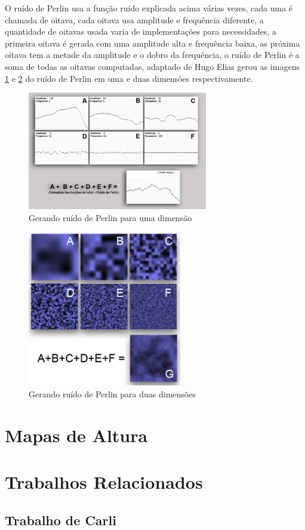 O ruído de Perlin usa a função ruído explicada acima várias vezes, cada uma é chamada
de oitava, cada oitava usa amplitude e frequência diferente, a quantidade de oitavas
usada varia de implementações para necessidades, a primeira oitava é gerada com uma
amplitude alta e frequência baixa, as próxima oitava tem a metade da amplitude e 
o dobro da frequência, o ruído de Perlin é a soma de todas as oitavas computadas,
adaptado de Hugo Elias \cite{carli2012canion} gerou as imagens
\ref{fig:perlin1d} e \ref{fig:perlin2d} do ruído de Perlin em uma e duas
dimensões respectivamente.
\begin{figure}[H]
    \centering
    \includegraphics[width=0.7\textwidth]{figuras/perlin1d.png}
    \caption{Gerando ruído de Perlin para uma dimensão}
    \label{fig:perlin1d}
\end{figure}
\begin{figure}[H]
    \centering
    \includegraphics[width=0.6\textwidth]{figuras/perlin2d.png}
    \caption{Gerando ruído de Perlin para duas dimensões}
    \label{fig:perlin2d}
\end{figure}

\section{Mapas de Altura}

\section{Trabalhos Relacionados}

\subsection{Trabalho de Carli}

